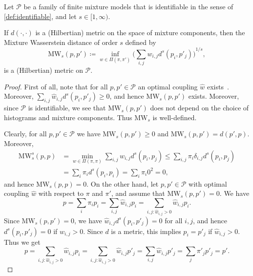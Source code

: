 \documentclass{article}
\begin{document}
\begin{theorem}
    Let $\mathcal{P}$ be a family of finite mixture models that is
    identifiable in the sense of \cref{def:identifiable}, and let $s \in [1, \infty)$.

    If $d(\cdot, \cdot)$ is a (Hilbertian) metric on the space of mixture components, then
    the Mixture Wasserstein distance of order $s$ defined by
    \begin{equation}\label{eq:mixture_distance}
        \mathrm{MW}_s(p, p') \coloneqq \inf_{w \in \Pi(\pi, \pi')} {\bigg(\sum_{i,j} w_{i,j} d^s(p_i, p'_j)\bigg)}^{1/s},
    \end{equation}
    is a (Hilbertian) metric on $\mathcal{P}$.
\end{theorem}

\begin{proof}
    First of all, note that for all $p, p' \in \mathcal{P}$ an optimal
    coupling $\hat{w}$ exists~\citep[Theorem~4.1]{Villani2009}. Moreover,
    $\sum_{i,j} \hat{w}_{i,j} d^s(p_i, p'_j) \geq 0$, and hence $\mathrm{MW}_s(p, p')$ exists.
    Moreover, since $\mathcal{P}$ is identifiable, we see that $\mathrm{MW}_s(p, p')$ does not
    depend on the choice of histograms and mixture components. Thus $\mathrm{MW}_s$ is well-defined.

    Clearly, for all $p, p' \in \mathcal{P}$ we have $\mathrm{MW}_s(p, p') \geq 0$ and
    $\mathrm{MW}_s(p, p') = d(p', p)$. Moreover,
    \begin{equation*}
        \begin{split}
            \mathrm{MW}_s^s(p, p) &= \min_{w \in \Pi(\pi, \pi)} \sum_{i,j} w_{i,j} d^s(p_i, p_j)
            \leq \sum_{i,j} \pi_i \delta_{i,j} d^s(p_i, p_j) \\
            &= \sum_i \pi_i d^s(p_i, p_i) = \sum_i \pi_i 0^2 = 0,
        \end{split}
    \end{equation*}
    and hence $\mathrm{MW}_s(p, p) = 0$. On the other hand, let $p, p' \in \mathcal{P}$ with
    optimal coupling $\hat{w}$ with respect to $\pi$ and $\pi'$, and assume that
    $\mathrm{MW}_s(p, p') = 0$. We have
    \begin{equation*}
        p = \sum_i \pi_i p_i = \sum_{i,j} \hat{w}_{i,j} p_i = \sum_{i,j \colon \hat{w}_{i,j} > 0} \hat{w}_{i,j} p_i.
    \end{equation*}
    Since $\mathrm{MW}_s(p, p') = 0$, we have $\hat{w}_{i,j} d^s(p_i, p'_j) = 0$ for all $i,j$, 
    and hence $d^s(p_i, p'_j) = 0$ if $\hat{w}_{i,j} > 0$. Since $d$ is a metric,
    this implies $p_i = p'_j$ if $\hat{w}_{i,j} > 0$. Thus we get
    \begin{equation*}
        p = \sum_{i,j \colon \hat{w}_{i,j} > 0} \hat{w}_{i,j} p_i = \sum_{i,j \colon \hat{w}_{i,j} > 0} \hat{w}_{i,j} p'_j
        = \sum_{i,j} \hat{w}_{i,j} p'_j = \sum_j \pi'_j p'_j = p'.
    \end{equation*}


\end{proof}
\end{document}
